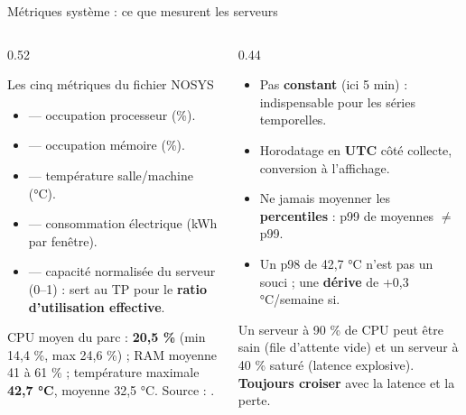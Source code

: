 \begin{frame}{Métriques système : ce que mesurent les serveurs}
\footnotesize%
\begin{columns}[t]
\begin{column}{0.52\textwidth}
\begin{block}{Les cinq métriques du fichier NOSYS}
\begin{itemize}
\item {} --- occupation processeur (\%).
\item {} --- occupation mémoire (\%).
\item {} --- température salle/machine (°C).
\item {} --- consommation électrique (kWh par fenêtre).
\item {} --- capacité normalisée du serveur (0--1) :
sert au TP pour le \textbf{ratio d'utilisation effective}.
\end{itemize}
\end{block}
\begin{ebox}
CPU moyen du parc : \textbf{20,5 \%} (min 14,4 \%, max 24,6 \%) ;
RAM moyenne 41 à 61 \% ; température maximale \textbf{42,7 °C},
moyenne 32,5 °C. Source : .
\end{ebox}
\end{column}
\begin{column}{0.44\textwidth}
\begin{kbox}
\begin{itemize}
\item Pas \textbf{constant} (ici 5 min) : indispensable pour les séries temporelles.
\item Horodatage en \textbf{UTC} côté collecte, conversion à l'affichage.
\item Ne jamais moyenner les \textbf{percentiles} : p99 de moyennes $\ne$ p99.
\item Un p98 de 42,7 °C n'est pas un souci ; une \textbf{dérive} de +0,3 °C/semaine si.
\end{itemize}
\end{kbox}
\begin{wbox}
Un serveur à 90 \% de CPU peut être sain (file d'attente vide)
et un serveur à 40 \% saturé (latence explosive).
\textbf{Toujours croiser} avec la latence et la perte.
\end{wbox}
\end{column}
\end{columns}
\end{frame}


